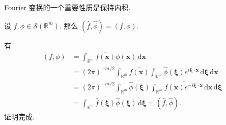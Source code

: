 Fourier 变换的一个重要性质是保持内积.

\begin{Theorem}
\label{thm:fourier-inner-product-preservation}
设 $f,\phi\in\mathcal{S}(\mathbb{R}^m)$. 那么 $(\widehat f,\widehat\phi)=(f,\phi)$.
\end{Theorem}

\begin{Proof}
有
\begin{equation}\label{eq:fourier-inner-product-preservation-proof}
\begin{aligned}
(f,\phi)&=\int_{\mathbb{R}^m}\overline{f(\bm{x})}\phi(\bm{x})\,\mathrm{d}\bm{x}\\
&=(2\pi)^{-m/2}\int_{\mathbb{R}^m}\overline{f(\bm{x})}\int_{\mathbb{R}^m}\widehat\phi(\bm{\xi})e^{i\bm{\xi}\cdot\bm{x}}\,\mathrm{d}\bm{\xi}\,\mathrm{d}\bm{x}\\
&=(2\pi)^{-m/2}\int_{\mathbb{R}^m}\widehat\phi(\bm{\xi})\int_{\mathbb{R}^m}\overline{f(\bm{x})e^{-i\bm{\xi}\cdot\bm{x}}}\,\mathrm{d}\bm{x}\,\mathrm{d}\bm{\xi}\\
&=\int_{\mathbb{R}^m}\overline{\widehat f(\bm{\xi})}\widehat\phi(\bm{\xi})\,\mathrm{d}\bm{\xi}=(\widehat f,\widehat\phi).
\end{aligned}
\end{equation}
证明完成.
\end{Proof}
